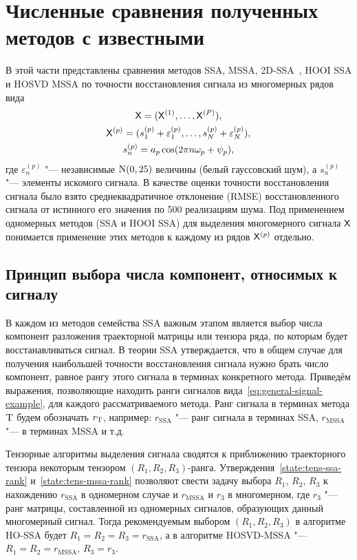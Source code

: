 \documentclass[specialist,
    substylefile = spbu_report.rtx,
    subf,href,colorlinks=true, 12pt]{disser}
\theoremstyle{plain}
\theoremstyle{definition}
\theoremstyle{remark}
\begin{document}
    \section{Численные сравнения полученных методов с известными}\label{sec:numerical-compar}
    В этой части представлены сравнения методов SSA, MSSA, 2D-SSA~\cite{ssa-2020}, HOOI SSA и HOSVD MSSA
    по точности восстановления сигнала из многомерных рядов вида
    \begin{gather}
        \mathsf{X} = (\mathsf{X}^{(1)}, \ldots, \mathsf{X}^{(P)}), \nonumber \\
        \mathsf{X}^{(p)} = (s_1^{(p)} + \varepsilon_1^{(p)}, \ldots, s_N^{(p)} + \varepsilon_N^{(p)}),\nonumber \\
        s_n^{(p)} = a_p \cos(2\pi n \omega_p + \psi_p), \label{eq:general-signal-example}
    \end{gather}
    где $\varepsilon_n^{(p)}$ "--- независимые $\mathrm{N}(0, 25)$ величины (белый гауссовский шум), а
    $s_n^{(p)}$ "--- элементы искомого сигнала.
    В качестве оценки точности восстановления сигнала было взято среднеквадратичное отклонение (RMSE)
    восстановленного сигнала от истинного его значения по 500 реализациям шума.
    Под применением одномерных методов (SSA и HOOI SSA) для выделения многомерного сигнала $\mathsf{X}$ понимается
    применение этих методов к каждому из рядов $\mathsf{X}^{(p)}$ отдельно.

    \subsection{Принцип выбора числа компонент, относимых к сигналу}\label{subsec:example-signal-ranks}
    В каждом из методов семейства SSA важным этапом является выбор числа компонент разложения траекторной матрицы
    или тензора ряда, по которым будет восстанавливаться сигнал.
    В теории SSA утверждается, что в общем случае для получения наибольшей точности восстановления
    сигнала нужно брать число компонент, равное рангу этого сигнала в терминах конкретного метода.
    Приведём выражения, позволяющие находить ранги сигналов вида~\eqref{eq:general-signal-example}, для каждого
    рассматриваемого метода.
    Ранг сигнала в терминах метода $\mathrm{T}$ будем обозначать $r_{\mathrm{T}}$, например: $r_\text{SSA}$ "---
    ранг сигнала в терминах SSA, $r_\text{MSSA}$ "--- в терминах MSSA и т.д.

    Тензорные алгоритмы выделения сигнала сводятся к приближению траекторного тензора некоторым
    тензором $(R_1, R_2, R_3)$-ранга.
    Утверждения~\ref{state:tens-ssa-rank} и~\ref{state:tens-mssa-rank} позволяют свести задачу выбора $R_1$,
    $R_2$, $R_3$ к нахождению $r_{\text{SSA}}$ в одномерном случае и $r_\text{MSSA}$ и $r_3$ в многомерном,
    где $r_3$ "--- ранг матрицы, составленной из одномерных сигналов, образующих данный многомерный сигнал.
    Тогда рекомендуемым выбором $(R_1, R_2, R_3)$ в алгоритме HO-SSA будет $R_1=R_2=R_3=r_\text{SSA}$, а
    в алгоритме HOSVD-MSSA "--- $R_1=R_2=r_\text{MSSA}$, $R_3 = r_3$.
\end{document}
